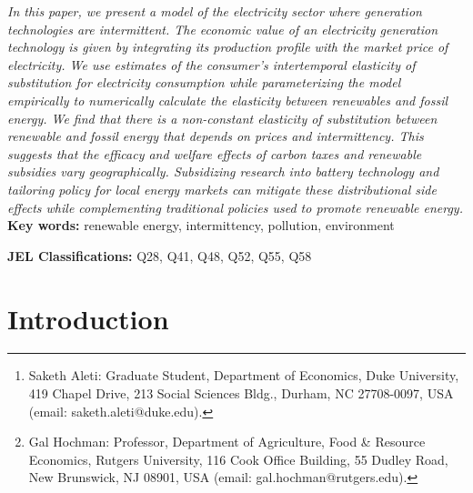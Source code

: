 \documentclass[11pt,a4paper,leqno]{extarticle}
\begin{document}
	
	\title{}
	
	\author[]{Saketh Aleti\thanks{Saketh Aleti: Graduate Student, Department of Economics, Duke University, 419 Chapel Drive, 213 Social Sciences Bldg., Durham, NC 27708-0097, USA (email: saketh.aleti@duke.edu).}  \, and  Gal Hochman\thanks{ Gal Hochman: Professor, Department of Agriculture, Food \& Resource Economics, Rutgers University, 116 Cook Office Building, 55 Dudley Road, New Brunswick, NJ 08901, USA (email: gal.hochman@rutgers.edu).}}
	
	
	\maketitle
	
	\begin{addmargin}[0.5in]{0.5in}
		\textit{In this paper, we present a model of the electricity sector where generation technologies are intermittent. The economic value of an electricity generation technology is given by integrating its production profile with the market price of electricity. We use estimates of the consumer's intertemporal elasticity of substitution for electricity consumption while  parameterizing the model empirically to numerically calculate the elasticity between renewables and fossil energy. We find that there is a non-constant elasticity of substitution between renewable and fossil energy that depends on prices and intermittency. This suggests that the efficacy and welfare effects of carbon taxes and renewable subsidies vary geographically. Subsidizing research into battery technology and tailoring policy for local energy markets can mitigate these distributional side effects while complementing traditional policies used to promote renewable energy. 
		}
		\\
		\noindent\textbf{Key words:} renewable energy, intermittency, pollution, environment
		
		\noindent\textbf{JEL Classifications:} Q28, Q41, Q48, Q52, Q55, Q58
	\end{addmargin}
	
	
	
	
	
	
	\section{Introduction}
	
\end{document}
